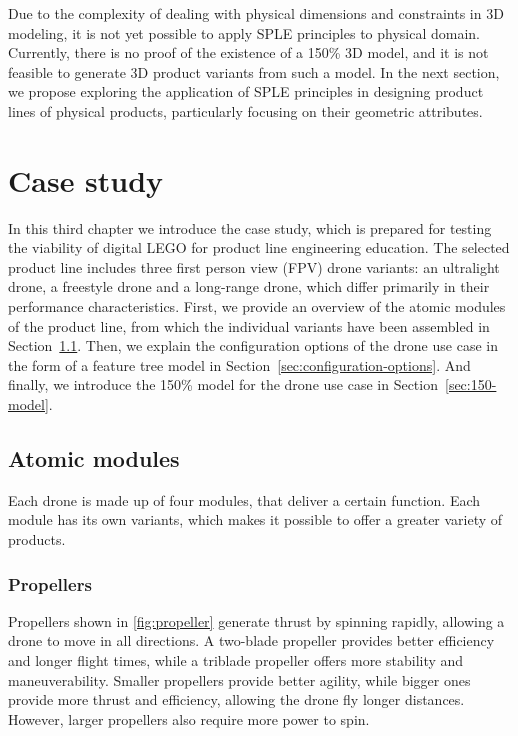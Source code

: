 \documentclass[sigconf,review]{acmart}
\begin{document}
Due to the complexity of dealing with physical dimensions and constraints in 3D modeling, it is not yet possible to apply SPLE principles to physical domain.  
Currently, there is no proof of the existence of a 150\% 3D model, and it is not feasible to generate 3D product variants from such a model. 
In the next section, we propose exploring the application of SPLE principles in designing product lines of physical products, particularly focusing on their geometric attributes.


\section{Case study}
\label{sec:case-study}

In this third chapter we introduce the case study, which is prepared for testing the viability of digital LEGO for product line engineering education.
The selected product line includes three first person view (FPV) drone variants: an ultralight drone, a freestyle drone and a long-range drone, which differ primarily in their performance characteristics.
First, we provide an overview of the atomic modules of the product line, from which the individual variants have been assembled in Section~\ref{sec:atomic-modules}.
Then, we explain the configuration options of the drone use case in the form of a feature tree model in Section~\ref{sec:configuration-options}.
And finally, we introduce the 150\% model for the drone use case in Section~\ref{sec:150-model}.


\subsection{Atomic modules}
\label{sec:atomic-modules}

Each drone is made up of four modules, that deliver a certain function. 
Each module has its own variants, which makes it possible to offer a greater variety of products. 


\subsubsection{Propellers}
\label{sec:propellers}

Propellers shown in \cref{fig:propeller} generate thrust by spinning rapidly, allowing a drone to move in all directions. 
A two-blade propeller provides better efficiency and longer flight times, while a triblade propeller offers more stability and maneuverability. 
Smaller propellers provide better agility, while bigger ones provide more thrust and efficiency, allowing the drone fly longer distances. 
However, larger propellers also require more power to spin.
\end{document}
